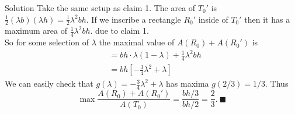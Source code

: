 \documentclass{article}
\begin{document}
\begin{solution}{Solution}
Take the same setup as claim 1. The area of $T_0'$ is
$\frac12 (\lambda b)(\lambda h) = \frac12 \lambda^2 bh$. If we inscribe
a rectangle $R_0'$ inside of $T_0'$ then it has a maximum area of
$
\frac14 \lambda^2 bh.
$
due to claim 1. \\

So for some selection of $\lambda$ the maximal value of $A(R_0) + A(R_0')$
is
\[
\begin{aligned}
&= bh \cdot \lambda (1 - \lambda) + \frac14 \lambda^2 bh \\
&= bh \left[ -\frac34 \lambda^2 + \lambda \right]
\end{aligned}
\]
We can easily check that $g(\lambda) = -\frac34 \lambda^2 + \lambda$
has maxima $g(2/3) = 1/3$. Thus
$$
\max \frac{A(R_0) + A(R_0')}{A(T_0)} = \frac{bh/3}{bh/2} = \frac23. \
\blacksquare
$$
\end{solution}
\end{document}
